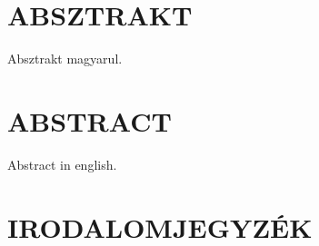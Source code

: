 %
%












\section*{ABSZTRAKT}
Absztrakt magyarul.

\newpage
\section*{ABSTRACT}
Abstract in english.



\newpage
{}
\tableofcontents
\newpage


\clearpage


\newpage


\newpage


\newpage


\newpage



\clearpage
\section{IRODALOMJEGYZÉK}
\printbibliography[heading=none]

\clearpage
\renewcommand{\listfigurename}{ÁBRAJEGYZÉK}
\listoffigures

\clearpage
\renewcommand{\listtablename}{TÁBLAJEGYZÉK}
\listoftables

%

